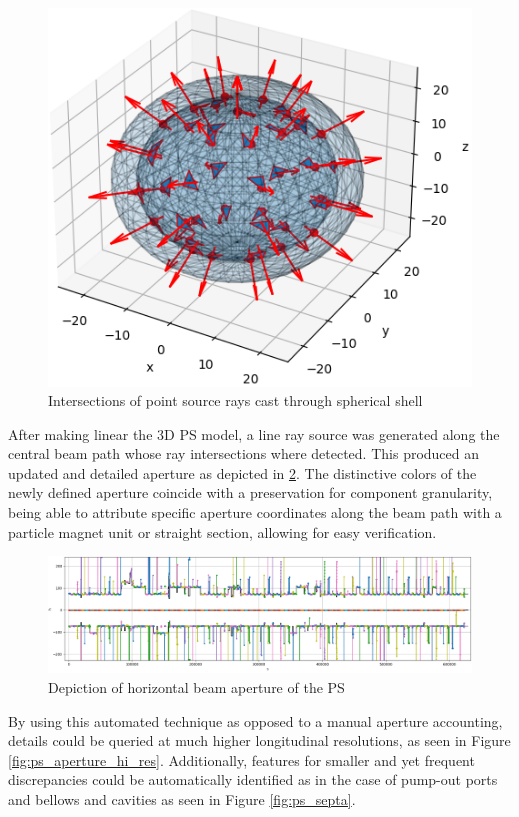 \begin{figure}
    \centering
    \includegraphics{figs/ray_casting.png}
    \caption{Intersections of point source rays cast through spherical shell}
    \label{fig:ray_casting}
\end{figure}

After making linear the 3D PS model, a line ray source was generated along the central beam path whose ray intersections where detected. This produced an updated and detailed aperture as depicted in \ref{fig:ps_aperture}. The distinctive colors of the newly defined aperture coincide with a preservation for component granularity, being able to attribute specific aperture coordinates along the beam path with a particle magnet unit or straight section, allowing for easy verification.

\begin{figure}
    \centering
    \includegraphics[width=\linewidth]{figs/ps_aperture.png}
    \caption{Depiction of horizontal beam aperture of the PS}
    \label{fig:ps_aperture}
\end{figure}

By using this automated technique as opposed to a manual aperture accounting, details could be queried at much higher longitudinal resolutions, as seen in Figure \ref{fig:ps_aperture_hi_res}. Additionally, features for smaller and yet frequent discrepancies could be automatically identified as in the case of pump-out ports and bellows and cavities as seen in Figure \ref{fig:ps_septa}.

